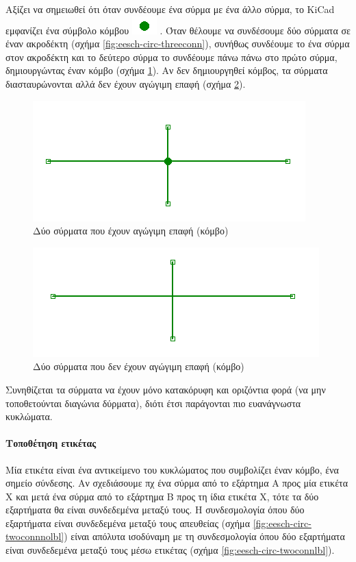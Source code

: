 \documentclass[a4paper]{article}
\begin{document}
Αξίζει να σημειωθεί ότι όταν συνδέουμε ένα σύρμα με ένα άλλο σύρμα, το \textenglish{KiCad} εμφανίζει ένα σύμβολο κόμβου \includegraphics[scale=.5]{img/eesch-ico-junc.png}
. Όταν θέλουμε να συνδέσουμε δύο σύρματα σε έναν ακροδέκτη (σχήμα \ref{fig:eesch-circ-threeconn}), συνήθως συνδέουμε το ένα σύρμα στον ακροδέκτη και το δεύτερο σύρμα το συνδέουμε πάνω πάνω στο πρώτο σύρμα, δημιουργώντας έναν κόμβο (σχήμα \ref{fig:eesch-circ-twowireconn}). Αν δεν δημιουργηθεί κόμβος, τα σύρματα διασταυρώνονται αλλά δεν έχουν αγώγιμη επαφή (σχήμα \ref{fig:eesch-circ-twowirenoconn}).

\begin{figure}
  \begin{center}
    \includegraphics[width=.35\textwidth]{img/eesch-circ-twowireconn.png}
    \caption{Δύο σύρματα που έχουν αγώγιμη επαφή (κόμβο)}
    \label{fig:eesch-circ-twowireconn}
  \end{center}
\end{figure}

\begin{figure}
  \begin{center}
    \includegraphics[width=.35\textwidth]{img/eesch-circ-twowirenoconn.png}
    \caption{Δύο σύρματα που δεν έχουν αγώγιμη επαφή (κόμβο)}
    \label{fig:eesch-circ-twowirenoconn}
  \end{center}
\end{figure}

Συνηθίζεται τα σύρματα να έχουν μόνο κατακόρυφη και οριζόντια φορά (να μην τοποθετούνται διαγώνια δύρματα), διότι έτσι παράγονται πιο ευανάγνωστα κυκλώματα.

\paragraph{Τοποθέτηση ετικέτας}
Μία ετικέτα είναι ένα αντικείμενο του κυκλώματος που συμβολίζει έναν κόμβο, ένα σημείο σύνδεσης. Αν σχεδιάσουμε πχ ένα σύρμα από το εξάρτημα Α προς μία ετικέτα Χ και μετά ένα σύρμα από το εξάρτημα Β προς τη ίδια ετικέτα Χ, τότε τα δύο εξαρτήματα θα είναι συνδεδεμένα μεταξύ τους. Η συνδεσμολογία όπου δύο εξαρτήματα είναι συνδεδεμένα μεταξύ τους απευθείας (σχήμα \ref{fig:eesch-circ-twoconnnolbl}) είναι απόλυτα ισοδύναμη με τη συνδεσμολογία όπου δύο εξαρτήματα είναι συνδεδεμένα μεταξύ τους μέσω ετικέτας (σχήμα \ref{fig:eesch-circ-twoconnlbl}).
\end{document}
